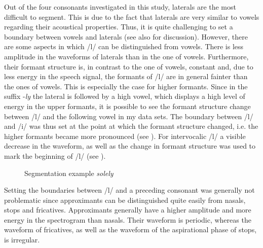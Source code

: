 Out of the four consonants investigated in this study, laterals are the most difficult to segment. This is due to the fact that laterals are very similar to vowels regarding their acoustical properties. Thus, it is quite challenging to set a boundary between vowels and laterals (see also \citealt[chapter 7]{Machac.2009} for discussion). However, there are some aspects in which /l/ can be distinguished from vowels. There is less amplitude in the waveforms of laterals than in the one of vowels.  Furthermore, their formant structure is, in contrast to the one of vowels, constant and, due to less energy in the speech signal, the formants of /l/ are in general fainter than the ones of vowels. This is especially the case for higher formants. Since in the suffix -\textit{ly} the lateral is followed by a high vowel, which displays a high level of energy in the upper formants, it is possible to see the formant structure change between /l/ and the following vowel in my data sets. The boundary between /l/ and /i/ was thus set at the point at which the formant structure changed, i.e. the higher formants became more pronounced (see ). For intervocalic /l/ a visible decrease in the waveform, as well as the change in formant structure was used to mark the beginning of /l/ (see ).
 
\begin{figure}  
	
	\caption{Segmentation example \textit{solely}}
	\label{fig:segmentation solely}
\end{figure}


Setting the boundaries between /l/ and a preceding consonant was generally not problematic since approximants can be distinguished quite easily from nasals, stops and fricatives. Approximants generally have a  higher amplitude and more energy in the spectrogram than nasals. Their waveform is periodic, whereas the waveform of fricatives, as well as the waveform of the aspirational phase of stops, is irregular.



